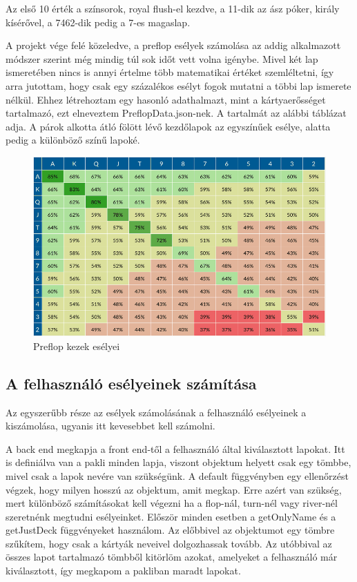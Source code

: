 Az első 10 érték a színsorok, royal flush-el kezdve, a 11-dik az ász póker, király kísérővel, a 7462-dik pedig a 7-es magaslap.

A projekt vége felé közeledve, a preflop esélyek számolása az addig alkalmazott módszer szerint még mindig túl sok időt vett volna igénybe. Mivel két lap ismeretében nincs is annyi értelme több matematikai értéket szemléltetni, így arra jutottam, hogy csak egy százalékos esélyt fogok mutatni a többi lap ismerete nélkül. Ehhez létrehoztam egy hasonló adathalmazt, mint a kártyaerősséget tartalmazó, ezt elneveztem PreflopData.json-nek. A tartalmát az alábbi táblázat adja. A párok alkotta átló fölött lévő kezdőlapok az egyszínűek esélye, alatta pedig a különböző színű lapoké.

\begin{figure}[h]
\centering
\includegraphics[scale=0.5]{images/preflop-chances.png}
\caption{Preflop kezek esélyei \cite{preflop-chances}}
\label{fig:preflop-chances}
\end{figure}

\subsection{A felhasználó esélyeinek számítása}
Az egyszerűbb része az esélyek számolásának a felhasználó esélyeinek a kiszámolása, ugyanis itt kevesebbet kell számolni. 

A back end megkapja a front end-től a felhasználó által kiválasztott lapokat. Itt is definiálva van a pakli minden lapja, viszont objektum helyett csak egy tömbbe, mivel csak a lapok nevére van szükségünk. A default függvényben egy ellenőrzést végzek, hogy milyen hosszú az objektum, amit megkap. Erre azért van szükség, mert különböző számításokat kell végezni ha a flop-nál, turn-nél vagy river-nél szeretnénk megtudni esélyeinket. Először minden esetben a getOnlyName és a getJustDeck függvényeket használom. Az előbbivel az objektumot egy tömbre szűkítem, hogy csak a kártyák neveivel dolgozhassak tovább. Az utóbbival az összes lapot tartalmazó tömbből kitörlöm azokat, amelyeket a felhasználó már kiválasztott, így megkapom a pakliban maradt lapokat.

